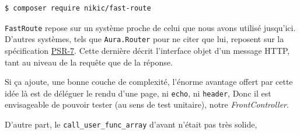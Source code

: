 \begin{english}

\begin{verbatim}
$ composer require nikic/fast-route
\end{verbatim}

\end{english}

\textenglish{\texttt{FastRoute}} repose sur un système proche de celui
que nous avons utilisé jusqu'ici. D'autres systèmes, tels que
\textenglish{\texttt{Aura.Router}} pour ne citer que lui, reposent sur
la spécification \href{http://www.php-fig.org/psr/psr-7/}{PSR-7}. Cette
dernière décrit l'interface objet d'un message HTTP, tant au niveau de
la requête que de la réponse.

Si ça ajoute, une bonne couche de complexité, l'énorme avantage offert
par cette idée là est de déléguer le rendu d'une page, ni
\textenglish{\texttt{echo}}, ni \textenglish{\texttt{header}}, Donc il
est envisageable de pouvoir tester (au sens de test unitaire), notre
\emph{FrontController}.

D'autre part, le \textenglish{\texttt{call\_user\_func\_array}} d'avant
n'était pas très solide,

\begin{english}

\begin{Shaded}
\begin{Highlighting}[]

 
 \OtherTok{;}
\OtherTok{;}

\OtherTok{(}\OtherTok{(}\OtherTok{)}
\NormalTok{\{}
    \OtherTok{(}\OtherTok{,} \StringTok{\textquotesingle{}/\textquotesingle{}}\OtherTok{,} \OtherTok{);}

    \OtherTok{(}
        \OtherTok{,}
        \OtherTok{,}
    \OtherTok{);}
\NormalTok{\}}\OtherTok{);}
\end{Highlighting}
\end{Shaded}

\end{english}

